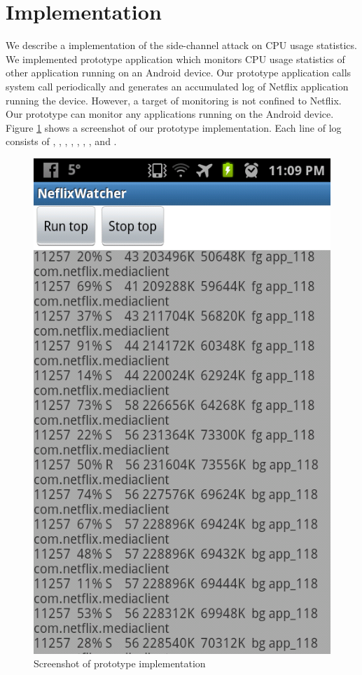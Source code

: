 \section{Implementation}
\label{sec:implementation} 

We describe a implementation of the side-channel attack on CPU usage statistics. 
We implemented prototype application which monitors CPU usage statistics of other application running on an Android device.
Our prototype application calls  system call periodically and generates an accumulated log of Netflix application running the device. 
However, a target of monitoring is not confined to Netflix.
Our prototype can monitor any applications running on the Android device. 
Figure \ref{fig:prototype_screenshot} shows a screenshot of our prototype implementation. 
Each line of log consists of , , , , , , ,  and . 

\begin{figure}[!h]
\centering
\includegraphics[scale=0.35]{Figures/netflix_watcher_screenshot2}
\caption{Screenshot of prototype implementation}
\label{fig:prototype_screenshot}
\end{figure}

